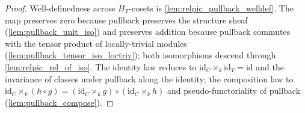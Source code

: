 \begin{proof}




\leanok
  Well-definedness across \(H_T\)-cosets is
  \cref{lem:relpic_pullback_welldef}. The map preserves zero because
  pullback preserves the structure sheaf (\cref{lem:pullback_unit_iso})
  and preserves addition because pullback commutes with the tensor product
  of locally-trivial modules (\cref{lem:pullback_tensor_iso_loctriv});
  both isomorphisms descend through \cref{lem:relpic_rel_of_iso}. The
  identity law reduces to
  \(\mathrm{id}_C \times_k \mathrm{id}_T = \mathrm{id}\) and the invariance
  of classes under pullback along the identity; the composition law to
  \(\mathrm{id}_C \times_k (h \circ g) = (\mathrm{id}_C \times_k g) \circ
  (\mathrm{id}_C \times_k h)\) and pseudo-functoriality of pullback
  (\cref{lem:pullback_compose}).
\end{proof}

